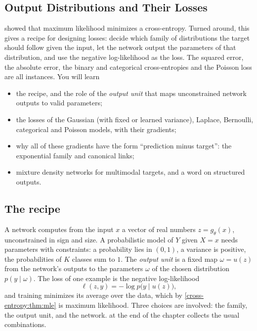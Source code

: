 \begin{notechapter}
\chapter{Output Distributions and Their Losses}\label{ch:output-distributions}

\begin{chapterintro}
 showed that maximum likelihood minimizes a cross-entropy.
Turned around, this gives a recipe for designing losses: decide which family of
distributions the target should follow given the input, let the network output
the parameters of that distribution, and use the negative log-likelihood as the
loss. The squared error, the absolute error, the binary and categorical
cross-entropies and the Poisson loss are all instances. You will learn
\begin{itemize}[nosep]
  \item the recipe, and the role of the \emph{output unit} that maps unconstrained
        network outputs to valid parameters;
  \item the losses of the Gaussian (with fixed or learned variance), Laplace,
        Bernoulli, categorical and Poisson models, with their gradients;
  \item why all of these gradients have the form ``prediction minus target'': the
        exponential family and canonical links;
  \item mixture density networks for multimodal targets, and a word on structured
        outputs.
\end{itemize}
\end{chapterintro}

\section{The recipe}\label{output-distributions:sec:recipe}

A network computes from the input $x$ a vector of real numbers $z = g_\theta(x)$,
unconstrained in sign and size. A probabilistic model of $Y$ given $X = x$ needs
parameters with constraints: a probability lies in $(0,1)$, a variance is
positive, the probabilities of $K$ classes sum to $1$. The \emph{output unit} is a
fixed map $\omega = u(z)$ from the network's outputs to the parameters $\omega$ of the
chosen distribution $p(y\mid\omega)$. The loss of one example is the negative
log-likelihood
\[
  \ell(z, y) = -\log p\bigl(y\mid u(z)\bigr),
\]
and training minimizes its average over the data, which by
\cref{cross-entropy:thm:mle} is maximum likelihood. Three choices are involved: the
family, the output unit, and the network. 
at the end of the chapter collects the usual combinations.


\end{notechapter}
